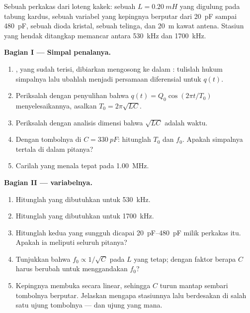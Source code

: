 \begin{problem}
\label{pb:g12:rlc-oscillations:1}
Sebuah perkakas dari loteng kakek: sebuah  $L = \qty{0.20}{mH}$ yang digulung pada
tabung kardus, sebuah  variabel yang kepingnya berputar dari
\qty{20}{pF} sampai \qty{480}{pF}, sebuah dioda kristal, sebuah telinga, dan
\qty{20}{m} kawat antena. Stasiun yang hendak ditangkap memancar antara
\qty{530}{kHz} dan \qty{1700}{kHz}.

\medskip
\noindent\textbf{Bagian I --- Simpal penalanya.}
\begin{enumerate}
  \item {}, yang sudah terisi, dibiarkan mengosong ke dalam :
        tulislah hukum simpalnya lalu ubahlah menjadi persamaan diferensial
        untuk $q(t)$.
  \item Periksalah dengan penyulihan bahwa $q(t) = Q_0\cos(2\pi t/T_0)$
        menyelesaikannya, asalkan $T_0 = 2\pi\sqrt{LC}$.
  \item Periksalah dengan analisis dimensi bahwa $\sqrt{LC}$ adalah waktu.
  \item Dengan tombolnya di $C = \qty{330}{pF}$: hitunglah $T_0$ dan $f_0$. Apakah
        simpalnya tertala di dalam pitanya?
  \item Carilah  yang menala tepat pada \qty{1.00}{MHz}.
\end{enumerate}

\medskip
\noindent\textbf{Bagian II ---  variabelnya.}
\begin{enumerate}[resume]
  \item Hitunglah  yang dibutuhkan untuk \qty{530}{kHz}.
  \item Hitunglah  yang dibutuhkan untuk \qty{1700}{kHz}.
  \item Hitunglah kedua  yang sungguh dicapai 
        \qtyrange{20}{480}{pF} milik perkakas itu. Apakah ia meliputi seluruh pitanya?
  \item Tunjukkan bahwa $f_0 \propto 1/\sqrt{C}$ pada $L$ yang tetap; dengan faktor
        berapa $C$ harus berubah untuk menggandakan $f_0$?
  \item Kepingnya membuka secara linear, sehingga $C$ turun mantap sembari tombolnya
        berputar. Jelaskan mengapa stasiunnya lalu berdesakan di salah satu ujung
        tombolnya --- dan ujung yang mana.
\end{enumerate}


\end{problem}
